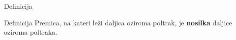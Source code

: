 \begin{frame}
\begin{alertblock}{Definicija}
\begin{figure}[H]
                \end{figure}
            \end{alertblock}

            \begin{alertblock}{Definicija}
                Premica, na kateri leži daljica oziroma poltrak, je \textbf{nosilka} daljice oziroma poltraka.
            \end{alertblock}
        \end{frame}


